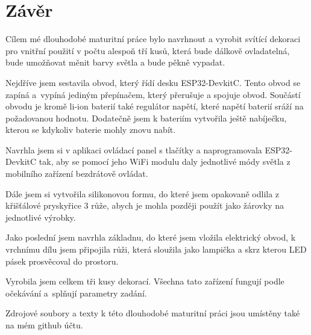 \chapter{Závěr}
Cílem mé dlouhodobé maturitní práce bylo  navrhnout a vyrobit svítící dekoraci pro vnitřní použití 
v počtu
alespoň tří kusů, která bude dálkově ovladatelná, bude umožňovat
měnit barvy světla
a bude pěkně vypadat.

Nejdříve jsem sestavila obvod, který řídí desku ESP32-DevkitC. Tento obvod se zapíná a~vypíná jediným přepínačem, který přerušuje a spojuje obvod. Součástí obvodu je kromě li-ion baterií také regulátor napětí, které napětí baterií sráží na požadovanou hodnotu. Dodatečně jsem k bateriím vytvořila ještě nabíječku, kterou se kdykoliv baterie mohly znovu nabít. 

Navrhla jsem si v aplikaci ovládací panel s tlačítky a naprogramovala ESP32-DevkitC tak, aby se pomocí jeho WiFi modulu daly jednotlivé módy světla z mobilního zařízení bezdrátově ovládat.  

Dále jsem si vytvořila silikonovou formu, do které jsem opakovaně odlila z křišťálové pryskyřice 3 růže, abych je mohla později použít jako žárovky na jednotlivé výrobky. 

Jako poslední jsem navrhla základnu, do které jsem vložila elektrický obvod, k vrchnímu dílu jsem připojila růži, která sloužila jako lampička a skrz kterou LED pásek prosvěcoval do prostoru. 

Vyrobila jsem celkem tři kusy dekorací. Všechna tato zařízení fungují podle očekávání a~splňují parametry zadání. 

Zdrojové soubory a texty k této dlouhodobé maturitní práci jsou umístěny také na mém github účtu.








 

